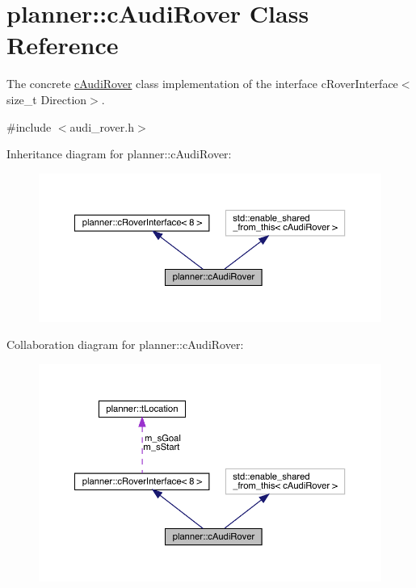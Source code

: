 \hypertarget{classplanner_1_1c_audi_rover}{}\section{planner\+:\+:c\+Audi\+Rover Class Reference}
\label{classplanner_1_1c_audi_rover}


The concrete \mbox{\hyperlink{classplanner_1_1c_audi_rover}{c\+Audi\+Rover}} class implementation of the interface c\+Rover\+Interface$<$size\+\_\+t Direction$>$.  




{\ttfamily \#include $<$audi\+\_\+rover.\+h$>$}



Inheritance diagram for planner\+:\+:c\+Audi\+Rover\+:\nopagebreak
\begin{figure}[H]
\begin{center}
\leavevmode
\includegraphics[width=350pt]{classplanner_1_1c_audi_rover__inherit__graph}
\end{center}
\end{figure}


Collaboration diagram for planner\+:\+:c\+Audi\+Rover\+:\nopagebreak
\begin{figure}[H]
\begin{center}
\leavevmode
\includegraphics[width=350pt]{classplanner_1_1c_audi_rover__coll__graph}
\end{center}
\end{figure}
